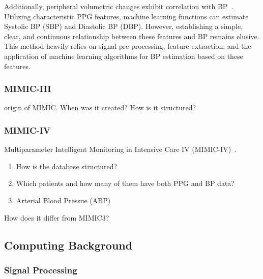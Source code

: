 Additionally, peripheral volumetric changes exhibit correlation with BP~\cite{langewoutersPressurediameterRelationshipsSegments1986}.
Utilizing characteristic PPG features, machine learning functions can estimate Systolic BP (SBP) and Diastolic BP (DBP).
However, establishing a simple, clear, and continuous relationship between these features and BP remains elusive.
This method heavily relies on signal pre-processing, feature extraction, and the application of machine learning algorithms for BP estimation based on these features.

\subsubsection{MIMIC-III}
\label{subsubsec:mimic3}

origin of MIMIC\@.
When was it created?
How is it structured?

\subsubsection{MIMIC-IV}
\label{subsubsec:mimic4}

Multiparameter Intelligent Monitoring in Intensive Care IV (MIMIC-IV)~\cite{johnsonMIMICIVFreelyAccessible2023}.

\begin{enumerate}
    \item How is the database structured?
    \item Which patients and how many of them have both PPG and BP data?
    \item Arterial Blood Pressue (ABP)
\end{enumerate}

How does it differ from MIMIC3?

\subsection{Computing Background}
\label{subsec:computing_background}

\subsubsection{Signal Processing}
\label{subsubsec:signal_processing}

